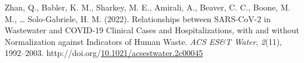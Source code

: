 \documentclass[12pt,twoside]{smiththesis}
\newlength{\cslhangindent}
\newenvironment{CSLReferences}[2] %
 {%
\setlength{\parindent}{0pt}
\ifodd #1 \everypar{\setlength{\hangindent}{\cslhangindent}}\ignorespaces\fi
\ifnum #2 > 0
\setlength{\parskip}{#2\baselineskip}
  \fi
}%
{}
\begin{document}
\begin{CSLReferences}{1}{0}
\leavevmode{}%
Zhan, Q., Babler, K. M., Sharkey, M. E., Amirali, A., Beaver, C. C., Boone, M. M., \ldots{} Solo-Gabriele, H. M. (2022). Relationships between {SARS-CoV-2} in {Wastewater} and {COVID-19 Clinical Cases} and {Hospitalizations}, with and without {Normalization} against {Indicators} of {Human Waste}. \emph{ACS ES\&T Water}, \emph{2}(11), 1992--2003. http://doi.org/\href{https://doi.org/10.1021/acsestwater.2c00045}{10.1021/acsestwater.2c00045}

\end{CSLReferences}

\end{document}
